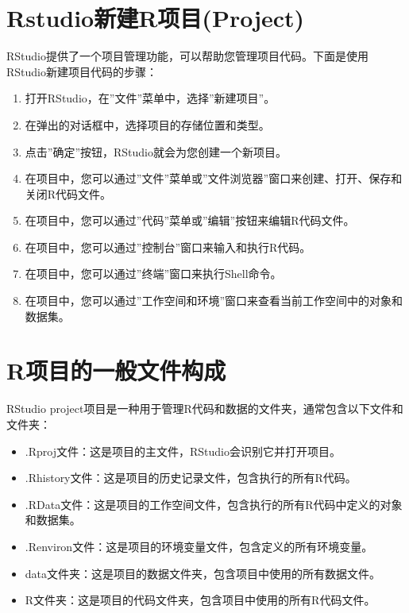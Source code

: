 \documentclass[
  letterpaper,
  DIV=11,
  numbers=noendperiod]{scrreprt}
\providecommand{\tightlist}{%
  \setlength{\itemsep}{0pt}\setlength{\parskip}{0pt}}\usepackage{longtable,booktabs,array}
\begin{document}
\section{Rstudio新建R项目(Project)}\label{rstudioux65b0ux5efarux9879ux76eeproject}

RStudio提供了一个项目管理功能，可以帮助您管理项目代码。下面是使用RStudio新建项目代码的步骤：

\begin{enumerate}
\def\labelenumi{\arabic{enumi}.}
\item
  打开RStudio，在''文件''菜单中，选择''新建项目''。
\item
  在弹出的对话框中，选择项目的存储位置和类型。
\item
  点击''确定''按钮，RStudio就会为您创建一个新项目。
\item
  在项目中，您可以通过''文件''菜单或''文件浏览器''窗口来创建、打开、保存和关闭R代码文件。
\item
  在项目中，您可以通过''代码''菜单或''编辑''按钮来编辑R代码文件。
\item
  在项目中，您可以通过''控制台''窗口来输入和执行R代码。
\item
  在项目中，您可以通过''终端''窗口来执行Shell命令。
\item
  在项目中，您可以通过''工作空间和环境''窗口来查看当前工作空间中的对象和数据集。
\end{enumerate}

\section{R项目的一般文件构成}\label{rux9879ux76eeux7684ux4e00ux822cux6587ux4ef6ux6784ux6210}

RStudio
project项目是一种用于管理R代码和数据的文件夹，通常包含以下文件和文件夹：

\begin{itemize}
\tightlist
\item
  .Rproj文件：这是项目的主文件，RStudio会识别它并打开项目。
\item
  .Rhistory文件：这是项目的历史记录文件，包含执行的所有R代码。
\item
  .RData文件：这是项目的工作空间文件，包含执行的所有R代码中定义的对象和数据集。
\item
  .Renviron文件：这是项目的环境变量文件，包含定义的所有环境变量。
\item
  data文件夹：这是项目的数据文件夹，包含项目中使用的所有数据文件。
\item
  R文件夹：这是项目的代码文件夹，包含项目中使用的所有R代码文件。
\end{itemize}
\end{document}
